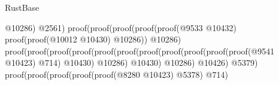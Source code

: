 \begin{lexlean}{RustBase}
\begin{coremodule}
                                                                                                  @10286)
                                                                                                @2561)
                                                                                              proof(proof(proof(proof(proof(@9533
                                                                                                          @10432)
                                                                                                        proof(proof(@10012
                                                                                                              @10430)
                                                                                                            @10286))
                                                                                                      @10286)
                                                                                                    proof(proof(proof(proof(proof(proof(proof(proof(proof(proof(proof(@9541
                                                                                                                            @10423)
                                                                                                                          @714)
                                                                                                                        @10430)
                                                                                                                      @10286)
                                                                                                                    @10430)
                                                                                                                  @10286)
                                                                                                                @10426)
                                                                                                              @5379)
                                                                                                            proof(proof(proof(proof(proof(@8280
                                                                                                                        @10423)
                                                                                                                      @5378)
                                                                                                                    @714)

\end{coremodule}
\end{lexlean}
